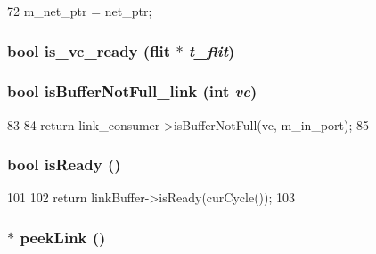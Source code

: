 \begin{DoxyCode}
72 { m_net_ptr = net_ptr; }
\end{DoxyCode}
\hypertarget{classNetworkLink_ac7f0b8d2495de3315119a243c4b3b6fd}{
\subsubsection[{is\_\-vc\_\-ready}]{\setlength{\rightskip}{0pt plus 5cm}bool is\_\-vc\_\-ready ({\bf flit} $\ast$ {\em t\_\-flit})}}
\label{classNetworkLink_ac7f0b8d2495de3315119a243c4b3b6fd}
\hypertarget{classNetworkLink_a95c1b8c2bdac97a3881b0adc14774fa2}{
\subsubsection[{isBufferNotFull\_\-link}]{\setlength{\rightskip}{0pt plus 5cm}bool isBufferNotFull\_\-link (int {\em vc})}}
\label{classNetworkLink_a95c1b8c2bdac97a3881b0adc14774fa2}



\begin{DoxyCode}
83 {
84     return link_consumer->isBufferNotFull(vc, m_in_port);
85 }
\end{DoxyCode}
\hypertarget{classNetworkLink_acbed040576a7a18e2d9c46b2f15e0162}{
\subsubsection[{isReady}]{\setlength{\rightskip}{0pt plus 5cm}bool isReady ()}}
\label{classNetworkLink_acbed040576a7a18e2d9c46b2f15e0162}



\begin{DoxyCode}
101 {
102     return linkBuffer->isReady(curCycle());
103 }
\end{DoxyCode}
\hypertarget{classNetworkLink_a799dc9601866e00ee9214f8e48afef3e}{
\subsubsection[{peekLink}]{ $\ast$ peekLink ()}}
\label{classNetworkLink_a799dc9601866e00ee9214f8e48afef3e}



